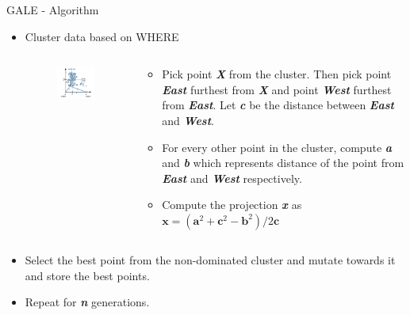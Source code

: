 \documentclass[10pt]{beamer}
\begin{document}
\begin{frame}{GALE - Algorithm}
    \begin{itemize}
    \item<1-> Cluster data based on WHERE
        \begin{columns}[t]
            \begin{column}{0.3\linewidth}
                \begin{figure}
                    \centering
                    \includegraphics[scale=0.4]{figures/where}
                    \label{fig:where}
                \end{figure}
            \end{column}
            \begin{column}{0.7\linewidth}
            \begin{itemize}
                \item<2-> Pick point \textbf{\textit{X}} from the cluster. Then pick point \textbf{\textit{East}} furthest from \textbf{\textit{X}} and point \textbf{\textit{West}} furthest from \textbf{\textit{East}}. Let \textbf{\textit{c}} be the distance between \textbf{\textit{East}} and \textbf{\textit{West}}.
                \item<3-> For every other point in the cluster, compute \textbf{\textit{a}} and \textbf{\textit{b}} which represents distance of the point from \textbf{\textit{East}} and \textbf{\textit{West}} respectively.
                \item<4-> Compute the projection \textbf{\textit{x}} as \(\bm{x}=(\bm{a}^2+\bm{c}^2-\bm{b}^2)/2\bm{c}\)
            \end{itemize}
            \end{column}
        \end{columns}
    \item<5-> Select the best point from the non-dominated cluster and mutate towards it and store the best points.
    \item<6-> Repeat for \textbf{\textit{n}} generations.
    \end{itemize}
\end{frame}
\end{document}
